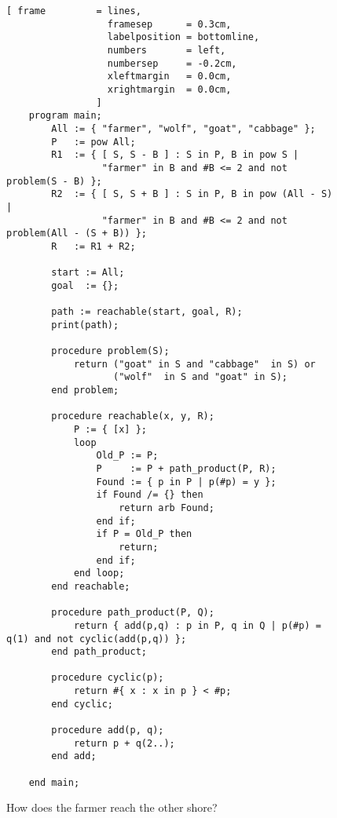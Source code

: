 \begin{figure}[!ht]
  \centering
\begin{Verbatim}[ frame         = lines, 
                  framesep      = 0.3cm, 
                  labelposition = bottomline,
                  numbers       = left,
                  numbersep     = -0.2cm,
                  xleftmargin   = 0.0cm,
                  xrightmargin  = 0.0cm,
                ]
    program main;
        All := { "farmer", "wolf", "goat", "cabbage" };
        P   := pow All;
        R1  := { [ S, S - B ] : S in P, B in pow S |
                 "farmer" in B and #B <= 2 and not problem(S - B) };
        R2  := { [ S, S + B ] : S in P, B in pow (All - S) |
                 "farmer" in B and #B <= 2 and not problem(All - (S + B)) };
        R   := R1 + R2;
    
        start := All;
        goal  := {};
    
        path := reachable(start, goal, R);
        print(path);
    
        procedure problem(S);
            return ("goat" in S and "cabbage"  in S) or
                   ("wolf"  in S and "goat" in S);
        end problem;
    
        procedure reachable(x, y, R);
            P := { [x] };
            loop
                Old_P := P;
                P     := P + path_product(P, R);
                Found := { p in P | p(#p) = y };
                if Found /= {} then
                    return arb Found;
                end if;
                if P = Old_P then
                    return;
                end if;
            end loop;
        end reachable;
    
        procedure path_product(P, Q);
            return { add(p,q) : p in P, q in Q | p(#p) = q(1) and not cyclic(add(p,q)) };
        end path_product;    
    
        procedure cyclic(p);
            return #{ x : x in p } < #p;
        end cyclic;
    
        procedure add(p, q);
            return p + q(2..);
        end add;    
    
    end main;
\end{Verbatim} 
\vspace*{-0.3cm}
\caption{How does the farmer reach the other shore?}  
\label{fig:wolf-ziege-kohl-assym.stl}
\end{figure} %


\noindent

